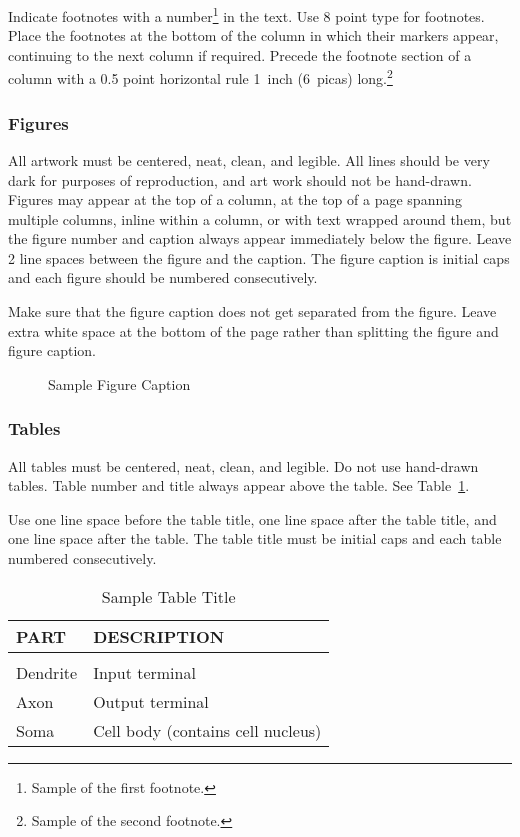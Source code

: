 \documentclass[twoside]{article}
\begin{document}
Indicate footnotes with a number\footnote{Sample of the first
  footnote.} in the text. Use 8 point type for footnotes. Place the
footnotes at the bottom of the column in which their markers appear,
continuing to the next column if required. Precede the footnote
section of a column with a 0.5 point horizontal rule 1~inch (6~picas)
long.\footnote{Sample of the second footnote.}

\subsubsection{Figures}

All artwork must be centered, neat, clean, and legible.  All lines
should be very dark for purposes of reproduction, and art work should
not be hand-drawn.  Figures may appear at the top of a column, at the
top of a page spanning multiple columns, inline within a column, or
with text wrapped around them, but the figure number and caption
always appear immediately below the figure.  Leave 2 line spaces
between the figure and the caption. The figure caption is initial caps
and each figure should be numbered consecutively.

Make sure that the figure caption does not get separated from the
figure. Leave extra white space at the bottom of the page rather than
splitting the figure and figure caption.
\begin{figure}[h]
\vspace{.3in}
\centerline{}
\vspace{.3in}
\caption{Sample Figure Caption}
\end{figure}

\subsubsection{Tables}

All tables must be centered, neat, clean, and legible. Do not use hand-drawn tables. Table number and title always appear above the table.
See Table~\ref{sample-table}.

Use one line space before the table title, one line space after the table title, and one line space after the table. The table title must be
initial caps and each table numbered consecutively.

\begin{table}[h]
\caption{Sample Table Title} \label{sample-table}
\begin{center}
\begin{tabular}{ll}
{\bf PART}  &{\bf DESCRIPTION} \\
\hline \\
Dendrite         &Input terminal \\
Axon             &Output terminal \\
Soma             &Cell body (contains cell nucleus) \\
\end{tabular}
\end{center}
\end{table}
\end{document}
